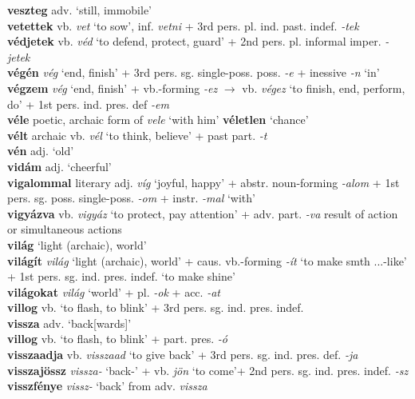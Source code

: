 \documentclass[11pt]{article}
\begin{document}
\textbf{veszteg} adv. `still, immobile' \\
\textbf{vetettek} vb. \emph{vet} `to sow', inf. \emph{vetni} + 3rd
pers. pl. ind. past. indef. \emph{-tek} \\
\textbf{védjetek} vb. \emph{véd} `to defend, protect, guard' + 2nd pers. pl. informal imper. \emph{-jetek} \\
\textbf{végén} \emph{vég} `end, finish' + 3rd
pers. sg. single\hyp{}poss. poss. \emph{-e} + inessive \emph{-n} `in' \\
\textbf{végzem} \emph{vég} `end, finish' + vb.\hyp{}forming \emph{-ez}
$\rightarrow$ vb. \emph{végez} `to finish, end, perform, do' + 1st
pers. ind. pres. def \emph{-em} \\
\textbf{véle} poetic, archaic form of \emph{vele} `with him'
\textbf{véletlen} `chance' \\
\textbf{vélt} archaic vb. \emph{vél} `to think, believe' + past
part. \emph{-t} \\
\textbf{vén} adj. `old' \\
\textbf{vidám} adj. `cheerful' \\
\textbf{vigalommal} literary adj. \emph{víg} `joyful, happy' +
abstr. noun\hyp{}forming \emph{-alom} + 1st
pers. sg. poss. single\hyp{}poss. \emph{-om} + instr. \emph{-mal} `with'  \\
\textbf{vigyázva} vb. \emph{vigyáz} `to protect, pay attention' +
  adv. part. \emph{-va} result of action or simultaneous actions \\
\textbf{világ} `light (archaic), world' \\
\textbf{világít} \emph{világ} `light (archaic), world' +
caus. vb.-forming \emph{-ít} `to make smth ...-like' + 1st
pers. sg. ind. pres. indef. `to make shine' \\
\textbf{világokat} \emph{világ} `world' + pl. \emph{-ok} +
acc. \emph{-at} \\
\textbf{villog} vb. `to flash, to blink' + 3rd
pers. sg. ind. pres. indef. \\
\textbf{vissza} adv. `back[wards]' \\
\textbf{villog} vb. `to flash, to blink'  + part. pres. \emph{-ó} \\
\textbf{visszaadja} vb. \emph{visszaad} `to give back' + 3rd
  pers. sg. ind. pres. def. \emph{-ja} \\
\textbf{visszajössz} \emph{vissza-} `back-' + vb. \emph{jön}
  `to come'+ 2nd pers. sg. ind. pres. indef. \emph{-sz} \\
\textbf{visszfénye} \emph{vissz-} `back' from adv. \emph{vissza}
\end{document}
